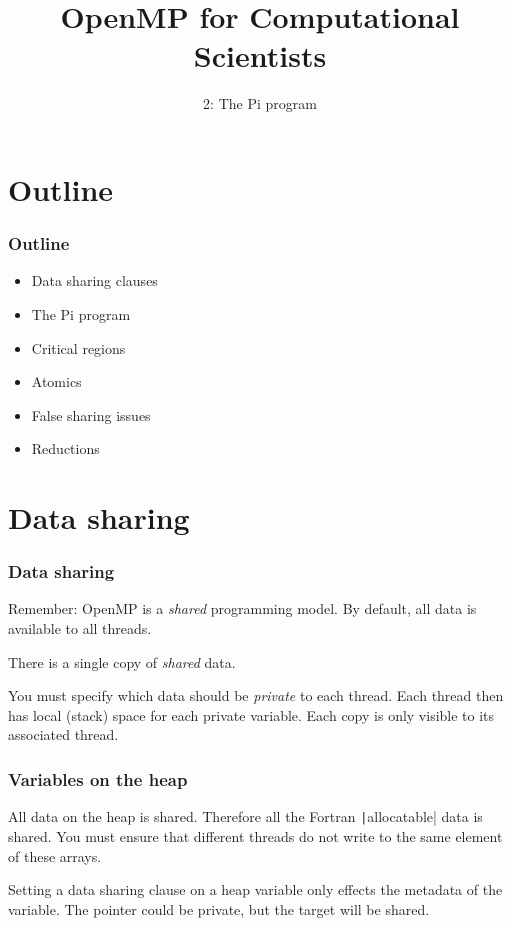\documentclass{beamer}
\title{OpenMP for Computational Scientists}
\subtitle{2: The Pi program}
\begin{document}
\frame{\titlepage}


\section{Outline}
\begin{frame}
\frametitle{Outline}
\begin{itemize}
  \item Data sharing clauses
  \item The Pi program
  \item Critical regions
  \item Atomics
  \item False sharing issues
  \item Reductions
\end{itemize}
\end{frame}

\section{Data sharing}
\begin{frame}
\frametitle{Data sharing}
Remember: OpenMP is a \emph{shared} programming model.
By default, all data is available to all threads.

There is a single copy of \emph{shared} data.

You must specify which data should be \emph{private} to each thread.
Each thread then has local (stack) space for each private variable.
Each copy is only visible to its associated thread.
\end{frame}


\begin{frame}
\frametitle{Variables on the heap}
All data on the heap is shared.
Therefore all the Fortran \texttt|allocatable| data is shared.
You must ensure that different threads do not write to the same element of these arrays.

Setting a data sharing clause on a heap variable only effects the metadata of the variable.
The pointer could be private, but the target will be shared.
\end{frame}

\end{document}
